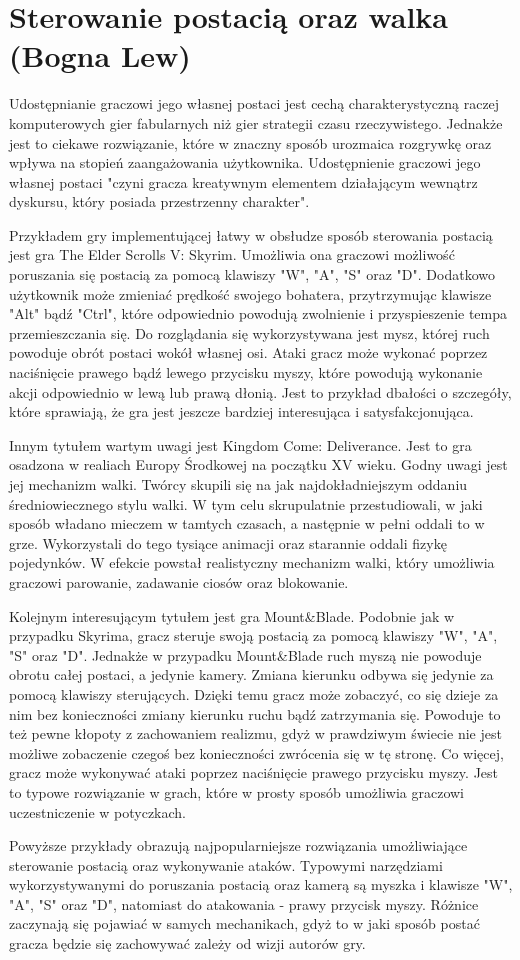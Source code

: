 \section{Sterowanie postacią oraz walka (Bogna Lew)}\label{s:walka}
Udostępnianie graczowi jego własnej postaci jest cechą charakterystyczną raczej komputerowych gier fabularnych niż gier
strategii czasu rzeczywistego. Jednakże jest to ciekawe rozwiązanie, które w znaczny sposób urozmaica rozgrywkę oraz
wpływa na stopień zaangażowania użytkownika. Udostępnienie graczowi jego własnej postaci "czyni gracza kreatywnym
elementem działającym wewnątrz dyskursu, który posiada przestrzenny charakter"\cite{olbrzymwcieniu}.

Przykładem gry implementującej łatwy w obsłudze sposób sterowania postacią jest gra The Elder Scrolls V: Skyrim. Umożliwia
ona graczowi możliwość poruszania się postacią za pomocą klawiszy "W", "A", "S" oraz "D". Dodatkowo użytkownik może
zmieniać prędkość swojego bohatera, przytrzymując klawisze "Alt" bądź "Ctrl", które odpowiednio powodują zwolnienie i
przyspieszenie tempa przemieszczania się. Do rozglądania się wykorzystywana jest mysz, której ruch powoduje obrót postaci
wokół własnej osi. Ataki gracz może wykonać poprzez naciśnięcie prawego bądź lewego przycisku myszy, które powodują
wykonanie akcji odpowiednio w lewą lub prawą dłonią. Jest to przykład dbałości o szczegóły, które sprawiają, że gra
jest jeszcze bardziej interesująca i satysfakcjonująca.

Innym tytułem wartym uwagi jest Kingdom Come: Deliverance. Jest to gra osadzona w realiach Europy Środkowej na początku
XV wieku. Godny uwagi jest jej mechanizm walki. Twórcy skupili się na jak najdokładniejszym oddaniu średniowiecznego
stylu walki. W tym celu skrupulatnie przestudiowali, w jaki sposób władano mieczem w tamtych czasach, a następnie w
pełni oddali to w grze. Wykorzystali do tego tysiące animacji oraz starannie oddali fizykę pojedynków. W efekcie powstał
realistyczny mechanizm walki, który umożliwia graczowi parowanie, zadawanie ciosów oraz blokowanie.

Kolejnym interesującym tytułem jest gra Mount\&Blade. Podobnie jak w przypadku Skyrima, gracz steruje swoją postacią za
pomocą klawiszy  "W", "A", "S" oraz "D". Jednakże w przypadku Mount\&Blade ruch myszą nie powoduje obrotu całej postaci,
a jedynie kamery. Zmiana kierunku odbywa się jedynie za pomocą klawiszy sterujących. Dzięki temu gracz może zobaczyć, co
się dzieje za nim bez konieczności zmiany kierunku ruchu bądź zatrzymania się. Powoduje to też pewne kłopoty z zachowaniem
realizmu, gdyż w prawdziwym świecie nie jest możliwe zobaczenie czegoś bez konieczności zwrócenia się w tę stronę.
Co więcej, gracz może wykonywać ataki poprzez naciśnięcie prawego przycisku myszy. Jest to typowe rozwiązanie w grach,
które w prosty sposób umożliwia graczowi uczestniczenie w potyczkach.

Powyższe przykłady obrazują najpopularniejsze rozwiązania umożliwiające sterowanie postacią oraz wykonywanie ataków.
Typowymi narzędziami wykorzystywanymi do poruszania postacią oraz kamerą są myszka i klawisze "W", "A", "S" oraz "D",
natomiast do atakowania - prawy przycisk myszy. Różnice zaczynają się pojawiać w samych mechanikach, gdyż to w jaki
sposób postać gracza będzie się zachowywać zależy od wizji autorów gry.